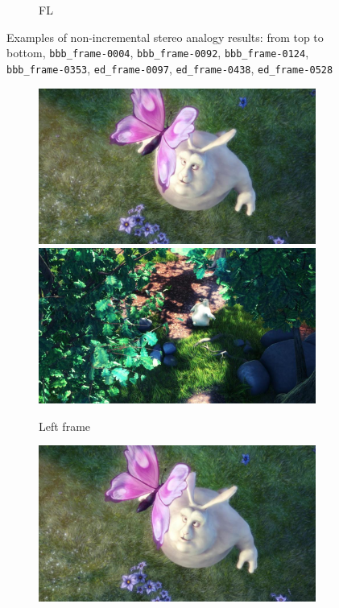 \begin{figure}
\begin{subfigure}[t]{0.135\textwidth}
		\caption{FL}
	\end{subfigure}
	\caption{Examples of non-incremental stereo analogy results: from top to bottom, \texttt{bbb\_frame-0004}, \texttt{bbb\_frame-0092}, \texttt{bbb\_frame-0124}, \texttt{bbb\_frame-0353}, \texttt{ed\_frame-0097}, \texttt{ed\_frame-0438}, \texttt{ed\_frame-0528}}
	\label{fig:stereo_results}
\end{figure}

\begin{figure}
	\centering
	\begin{subfigure}[t]{0.24\textwidth}
		\includegraphics[width=\textwidth]{figures/frames/left/frame-0076}\\
		\includegraphics[width=\textwidth]{figures/frames/left/frame-0391}
		\caption{Left frame}
	\end{subfigure}
	\begin{subfigure}[t]{0.24\textwidth}
		\includegraphics[width=\textwidth]{figures/frames/right/frame-0076}\\

\end{subfigure}
\end{figure}
